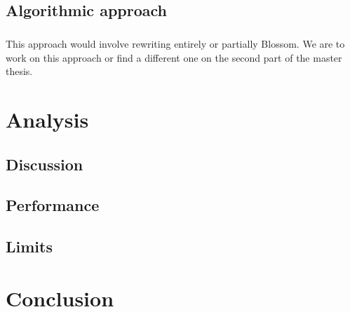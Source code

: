 \documentclass[12pt]{report}
\theoremstyle{definition}
\theoremstyle{definition}
\begin{document}
\section{Algorithmic approach}
\paragraph{} This approach would involve rewriting entirely or partially Blossom. We are to work on this
approach or find a different one on the second part of the master thesis.


\chapter{Analysis}
\section{Discussion}
\section{Performance}
\section{Limits}


\chapter*{Conclusion}




\cite{multivariate-explaining} \cite{blossom} \cite{murtree} \cite{wiki-decision-tree}
\end{document}

